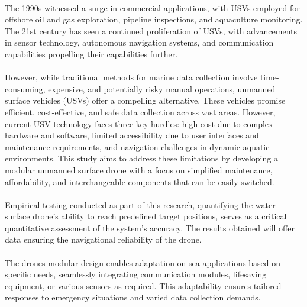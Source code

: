 \paragraph{} The 1990s witnessed a surge in commercial applications, with USVs employed for offshore oil and gas exploration, pipeline inspections, and 
            aquaculture monitoring. The 21st century has seen a continued proliferation of USVs, with advancements in sensor technology, autonomous 
            navigation systems, and communication capabilities propelling their capabilities further.

\paragraph{} However, while traditional methods for marine data collection involve time-consuming, expensive, and potentially risky manual operations,
            unmanned surface vehicles (USVs) offer a compelling alternative. These vehicles promise efficient, cost-effective, and safe data collection 
            across vast areas. However, current USV technology faces three key hurdles: high cost due to complex hardware and software, limited 
            accessibility due to user interfaces and maintenance requirements, and navigation challenges in dynamic aquatic environments. This study aims 
            to address these limitations by developing a modular unmanned surface drone with a focus on simplified maintenance, affordability, and 
            interchangeable components that can be easily switched.

\paragraph{} Empirical testing conducted as part of this research, quantifying the water surface drone's ability to reach predefined target positions, 
            serves as a critical quantitative assessment of the system's accuracy. The results obtained will offer data ensuring the navigational 
            reliability of the drone.

\paragraph{} The drones modular design enables adaptation on sea applications based on specific needs, seamlessly integrating communication modules, 
            lifesaving equipment, or various sensors as required. This adaptability ensures tailored responses to emergency situations and varied data 
            collection demands. 


